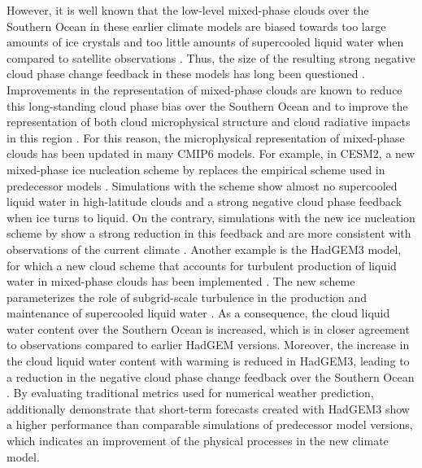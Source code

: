 However, it is well known that the low-level mixed-phase clouds over the
Southern Ocean in these earlier climate models are biased towards too large
amounts of ice crystals and too little amounts of supercooled liquid water when
compared to satellite observations \autocite{BodasSalcedo2016}. Thus, the size
of the resulting strong negative cloud phase change feedback in these models
has long been questioned \autocite{McCoy2015, Tan2016}. Improvements in the
representation of mixed-phase clouds are known to reduce this long-standing
cloud phase bias over the Southern Ocean \autocite{BodasSalcedo2016, McCoy2016}
and to improve the representation of both cloud microphysical structure and
cloud radiative impacts in this region \autocite{Hyder2018, Kay2016}. For this
reason, the microphysical representation of mixed-phase clouds has been updated
in many \acs{CMIP}6 models. For example, in \acs{CESM}2, a new mixed-phase ice
nucleation scheme by \textcite{Hoose2010} replaces the \textcite{Meyers1992}
empirical scheme used in predecessor models \autocite{Gettelman2019}.
Simulations with the \textcite{Meyers1992} scheme show almost no supercooled
liquid water in high-latitude clouds and a strong negative cloud phase feedback
when ice turns to liquid. On the contrary, simulations with the new ice
nucleation scheme by \textcite{Hoose2010} show a strong reduction in this
feedback and are more consistent with observations of the current climate
\autocite{Gettelman2019}. Another example is the \acs{HadGEM}3 model, for which
a new cloud scheme that accounts for turbulent production of liquid water in
mixed-phase clouds has been implemented \autocite{BodasSalcedo2019}. The new
scheme parameterizes the role of subgrid-scale turbulence in the production and
maintenance of supercooled liquid water \autocite{Furtado2016}. As a
consequence, the cloud liquid water content over the Southern Ocean is
increased, which is in closer agreement to observations compared to earlier
\ac{HadGEM} versions. Moreover, the increase in the cloud liquid water content
with warming is reduced in \acs{HadGEM}3, leading to a reduction in the
negative cloud phase change feedback over the Southern Ocean
\autocite{BodasSalcedo2019}. By evaluating traditional metrics used for
numerical weather prediction, \textcite{Williams2020} additionally demonstrate
that short-term forecasts created with \acs{HadGEM}3 show a higher performance
than comparable simulations of predecessor model versions, which indicates an
improvement of the physical processes in the new climate model.

